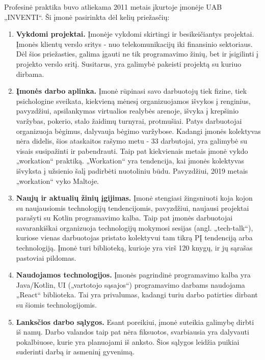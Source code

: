 Profesinė praktika buvo atliekama 2011 metais įkurtoje įmonėje UAB „INVENTI“. Ši įmonė pasirinkta dėl kelių priežasčių:

\begin{enumerate}
    \item \textbf{Vykdomi projektai.} Įmonėje vykdomi skirtingi ir besikeičiantys projektai. Įmonės klientų verslo sritys - nuo telekomunikacijų iki finansinio sektoriaus.
    Dėl šios priežasties, galima įgauti ne tik programavimo žinių, bet ir įsigilinti į projekto verslo sritį. Susitarus, yra galimybė pakeisti projektą su kuriuo dirbama.
    \item \textbf{Įmonės darbo aplinka.} Įmonė rūpinasi savo darbuotojų tiek fizine, tiek psichologine sveikata, kiekvieną mėnesį organizuojamos išvykos į renginius, pavyzdžiui,
    apsilankymas virtualios realybės arenoje, išvyka į krepšinio varžybas, pokerio, stalo žaidimų turnyrai, protmušiai. Patys darbuotojai organizuoja bėgimus, dalyvauja bėgimo
    varžybose. Kadangi įmonės kolektyvas nėra didelis, šios ataskaitos rašymo metu - 33 darbutojai, yra galimybė su visais susipažinti ir pabendrauti.
    Taip pat kiekvienais metais įmonė vykdo „workation“ praktiką. „Workation“ yra tendencija, kai įmonės kolektyvas išvyksta į užsienio šalį padirbėti nuotoliniu būdu.
    Pavyzdžiui, 2019 metais „workation“ vyko Maltoje.
    \item \textbf{Naujų ir aktualių žinių įgijimas.} Įmonė stengiasi žingsniuoti koja kojon su naujausiomis technologijų tendencijomis, pavyzdžiui, naujausi projektai parašyti su
    Kotlin programavimo kalba. Taip pat įmonės darbuotojai savarankiškai organizuoja technologijų mokymosi sesijas (angl. „tech-talk“), kuriose vienas darbuotojas pristato kolektyvui
    tam tikrą PĮ tendenciją arba technologiją. Įmonė turi biblioteką, kurioje yra virš 120 knygų, ir jų sąrašas pastoviai pildomas.
    \item \textbf{Naudojamos technologijos.} Įmonės pagrindinė programavimo kalba yra Java/Kotlin, UI („vartotojo sąsajos“) programavimo darbams naudojama „React“ biblioteka. Tai yra privalumas,
    kadangi turiu darbo patirties dirbant su šiomis technologijomis.
    \item \textbf{Lanksčios darbo sąlygos.} Esant poreikiui, įmonė suteikia galimybę dirbti iš namų.
    Darbo valandos taip pat nėra fiksuotos, svarbiausia yra dalyvauti pokalbiuose, kurie yra planuojami iš anksto. Šios sąlygos leidžia
    puikiai suderinti darbą ir asmeninį gyvenimą.
\end{enumerate}

